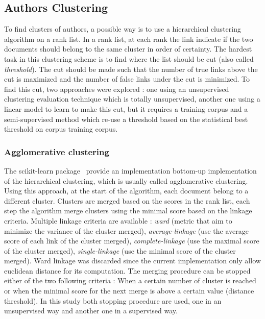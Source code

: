 \subsection{Authors Clustering \label{sec:authors_clustering}}

To find clusters of authors, a possible way is to use a hierarchical clustering algorithm on a rank list.
In a rank list, at each rank the link indicate if the two documents should belong to the same cluster in order of certainty.
The hardest task in this clustering scheme is to find where the list should be cut (also called \textit{threshold}).
The cut should be made such that the number of true links above the cut is maximized and the number of false links under the cut is minimized.
To find this cut, two approaches were explored : one using an unsupervised clustering evaluation technique which is totally unsupervised, another one using a linear model to learn to make this cut, but it requires a training corpus and a semi-supervised method which re-use a threshold based on the statistical best threshold on corpus training corpus.

\subsubsection{Agglomerative clustering}

The scikit-learn package~\cite{sklearn} provide an implementation bottom-up implementation of the hierarchical clustering, which is usually called agglomerative clustering.
Using this approach, at the start of the algorithm, each document belong to a different cluster.
Clusters are merged based on the scores in the rank list, each step the algorithm merge clusters using the minimal score based on the linkage criteria.
Multiple linkage criteria are available : \textit{ward} (metric that aim to minimize the variance of the cluster merged), \textit{average-linkage} (use the average score of each link of the cluster merged), \textit{complete-linkage} (use the maximal score of the cluster merged), \textit{single-linkage} (use the minimal score of the cluster merged).
Ward linkage was discarded since the current implementation only allow euclidean distance for its computation.
The merging procedure can be stopped either of the two following criteria : When a certain number of cluster is reached or when the minimal score for the next merge is above a certain value (distance threshold).
In this study both stopping procedure are used, one in an unsupervised way and another one in a supervised way.


